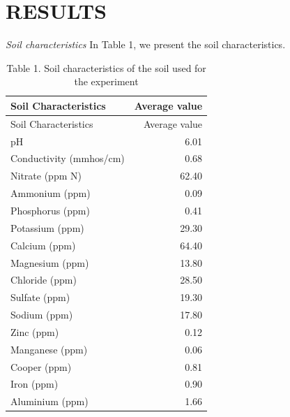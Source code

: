 \documentclass[11pt,]{article}
\begin{document}
\section{RESULTS}\label{results}

\emph{Soil characteristics} In Table 1, we present the soil
characteristics.\\
\hspace*{0.333em}

\begin{longtable}[]{@{}lr@{}}
\caption{Table 1. Soil characteristics of the soil used for the
experiment}\tabularnewline
\toprule
Soil Characteristics & Average value\tabularnewline
\midrule
\endfirsthead
\toprule
Soil Characteristics & Average value\tabularnewline
\midrule
\endhead
pH & 6.01\tabularnewline
Conductivity (mmhos/cm) & 0.68\tabularnewline
Nitrate (ppm N) & 62.40\tabularnewline
Ammonium (ppm) & 0.09\tabularnewline
Phosphorus (ppm) & 0.41\tabularnewline
Potassium (ppm) & 29.30\tabularnewline
Calcium (ppm) & 64.40\tabularnewline
Magnesium (ppm) & 13.80\tabularnewline
Chloride (ppm) & 28.50\tabularnewline
Sulfate (ppm) & 19.30\tabularnewline
Sodium (ppm) & 17.80\tabularnewline
Zinc (ppm) & 0.12\tabularnewline
Manganese (ppm) & 0.06\tabularnewline
Cooper (ppm) & 0.81\tabularnewline
Iron (ppm) & 0.90\tabularnewline
Aluminium (ppm) & 1.66\tabularnewline
\bottomrule
\end{longtable}

~
\end{document}
